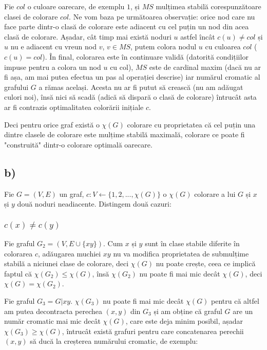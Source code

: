 \documentclass[a4paper,12pt]{article}
\begin{document}
{Fie $col$ o culoare oarecare, de exemplu $1$, și $MS$ mulțimea stabilă corespunzătoare clasei de colorare $col$. Ne vom baza pe următoarea observație: orice nod care nu face parte dintr-o clasă de colorare este adiacent cu cel puțin un nod din acea clasă de colorare. Așadar, cât timp mai există noduri $u$ astfel încât $c(u) \neq col$ și $u$ nu e adiacent cu vreun nod $v$, $v \in MS$, putem colora nodul $u$ cu culoarea $col$ ($c(u)=col$). În final, colorarea este în continuare validă (datorită condițiilor impuse pentru a colora un nod $u$ cu col), $MS$ este de cardinal maxim (dacă nu ar fi așa, am mai putea efectua un pas al operației descrise) iar numărul cromatic al grafului $G$ a rămas același. Acesta nu ar fi putut să crească (nu am adăugat culori noi), însă nici să scadă (adică să dispară o clasă de colorare) întrucât asta ar fi contrazis optimalitatea colorării inițiale $c$. 

Deci pentru orice graf există o $\chi(G)$ colorare cu proprietatea că cel puțin una dintre clasele de colorare este mulțime stabilă maximală, colorare ce poate fi "construită" dintr-o colorare optimală oarecare.

\subsection{b)}

Fie $G = (V,E)$ un graf, $c:V \leftarrow \{1, 2, ..., \chi(G)\}$ o $\chi(G)$ colorare a lui $G$ și $x$ și $y$ două noduri neadiacente. Distingem două cazuri:

\subsubsection{$c(x) \neq c(y)$}

Fie graful $G_2 = (V, E \cup \{xy\})$. Cum $x$ și $y$ sunt în clase stabile diferite în colorarea $c$, adăugarea muchiei $xy$ nu va modifica proprietatea de submulțime stabilă a niciunei clase de colorare, deci $\chi(G)$ nu poate crește, ceea ce implică faptul că $\chi(G_2) \leq \chi(G)$, însă $\chi(G_2)$ nu poate fi mai mic decât $\chi(G)$, deci $\chi(G) = \chi(G_2)$.

Fie graful $G_3 = G|xy$. $\chi(G_3)$ nu poate fi mai mic decât $\chi(G)$ pentru că altfel am putea decontracta perechea $(x,y)$ din $G_3$ și am obține că graful $G$ are un număr cromatic mai mic decât $\chi(G)$, care este deja minim posibil, așadar $\chi(G_3) \geq \chi(G)$, întrucât există grafuri pentru care concatenarea perechii $(x,y)$ să ducă la creșterea numărului cromatic, de exemplu:

}
\end{document}
